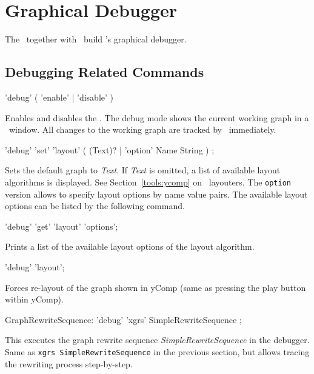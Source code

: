 

\section{Graphical Debugger}
\label{sct:debugger}
The \GrShell\ together with \yComp\ build \GrG's graphical debugger.

\subsection{Debugging Related Commands}

\begin{rail}
  'debug' ( 'enable' | 'disable' )
\end{rail}
Enables and disables the .
The debug mode shows the current working graph in a \yComp\ window.
All changes to the working graph are tracked by \yComp\ immediately.  

\begin{rail}
  'debug' 'set' 'layout' ( (Text)? | 'option' Name String ) ;
\end{rail}
Sets the default graph  to \emph{Text}.
If \emph{Text} is omitted, a list of available layout algorithms is displayed.
See Section~\ref{tools:ycomp} on \yComp\ layouters.
The \texttt{option} version allows to specify layout options by name value pairs.
The available layout options can be listed by the following command.

\begin{rail}
  'debug' 'get' 'layout' 'options';
\end{rail}
Prints a list of the available layout options of the layout algorithm.

\begin{rail}
  'debug' 'layout';
\end{rail}
Forces re-layout of the graph shown in yComp (same as pressing the play button within yComp).

\begin{rail}
  GraphRewriteSequence: 'debug' 'xgrs' SimpleRewriteSequence ;
\end{rail}
This executes the graph rewrite sequence \emph{SimpleRewriteSequence} in the debugger.
Same as \texttt{xgrs SimpleRewriteSequence} in the previous section, but allows tracing the rewriting process step-by-step. 

